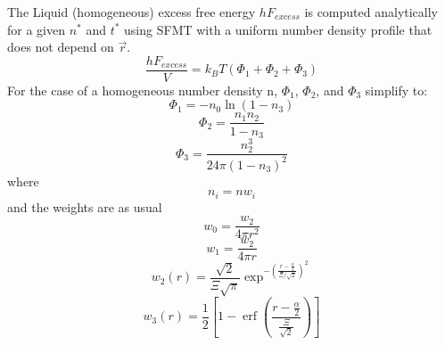 \documentclass[12pt]{article}
\begin{document}
The Liquid (homogeneous) excess free energy $hF_{excess}$ is computed analytically for a given $n^*$ and $t^*$ using SFMT with a uniform number density profile that does not depend on $\vec r$. 
\begin{displaymath}{\frac{hF_{excess}}{V} = k_BT(\Phi_1+\Phi_2+\Phi_3)}\end{displaymath} 
For the case of a homogeneous number density n, $\Phi_1$, $\Phi_2$, and $\Phi_3$ simplify to:
\begin{displaymath}{\Phi_1= -n_0\ln(1-n_3)}\end{displaymath} 
\begin{displaymath}{\Phi_2= \frac{n_1n_2}{1-n_3}}\end{displaymath} 
\color{red}\begin{displaymath}{\Phi_3=\frac{n_2^3}{24\pi(1-n_3)^2}}\end{displaymath}\color{black}
where \begin{displaymath}{n_i=nw_i}\end{displaymath} 
and the weights are as usual 
\begin{equation}{w_{0}=\frac{w_{2}}{4\pi{r}^2}}\end{equation}
\begin{equation}{w_{1}=\frac{w_{2}}{4\pi{r}}}\end{equation}
\begin{equation}{ w_2(r)=\frac{\sqrt{2}}{\Xi\sqrt\pi}\exp^{-\left(\frac{r-\frac{\alpha}{2}}{\Xi/\sqrt{2}}\right)^2} }\end{equation}
\begin{equation}{w_3(r)=\frac{1}{2}}\left[1-\operatorname{erf}\left(\frac{r-\frac{\alpha}{2}}{\frac{\Xi}{\sqrt{2}}}\right)\right]\end{equation} 
\[\]
\end{document}
